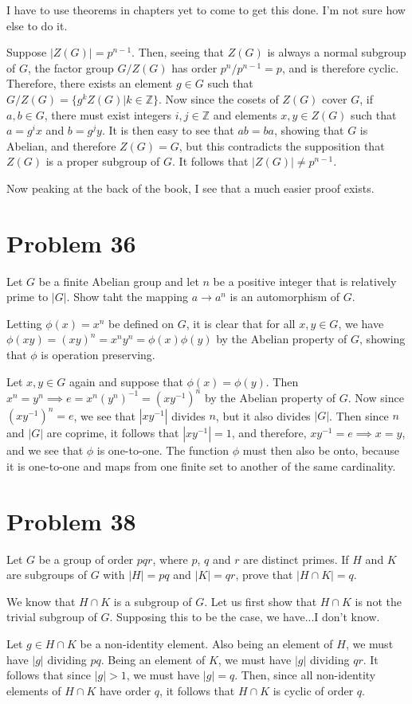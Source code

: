\documentclass[12pt]{article}
\newcommand{\Z}{\mathbb{Z}}
\begin{document}
I have to use theorems in chapters yet to come to get this done.  I'm not sure
how else to do it.

Suppose $|Z(G)|=p^{n-1}$.  Then, seeing that $Z(G)$ is always
a normal subgroup of $G$, the factor group $G/Z(G)$ has
order $p^n/p^{n-1}=p$, and is therefore cyclic.
Therefore, there exists an element $g\in G$ such that $G/Z(G)=\{g^kZ(G)|k\in\Z\}$.
Now since the cosets of $Z(G)$ cover $G$, if $a,b\in G$, there must exist integers $i,j\in\Z$
and elements $x,y\in Z(G)$ such that $a=g^ix$ and $b=g^jy$.
It is then easy to see that $ab=ba$, showing that $G$ is
Abelian, and therefore $Z(G)=G$, but this contradicts the supposition that $Z(G)$ is a proper
subgroup of $G$.  It follows that $|Z(G)|\neq p^{n-1}$.

Now peaking at the back of the book, I see that a much easier
proof exists.

\section*{Problem 36}

Let $G$ be a finite Abelian group and let $n$ be a positive integer that is relatively prime to $|G|$.
Show taht the mapping $a\to a^n$ is an automorphism of $G$.

Letting $\phi(x)=x^n$ be defined on $G$, it is clear that for all $x,y\in G$,
we have $\phi(xy)=(xy)^n=x^ny^n=\phi(x)\phi(y)$ by the Abelian property
of $G$, showing that $\phi$ is operation preserving.

Let $x,y\in G$ again and suppose that $\phi(x)=\phi(y)$.
Then $x^n=y^n\implies e=x^n(y^n)^{-1}=(xy^{-1})^n$
by the Abelian property of $G$.  Now since $(xy^{-1})^n=e$,
we see that $|xy^{-1}|$ divides $n$, but it also divides $|G|$.
Then since $n$ and $|G|$ are coprime, it follows that $|xy^{-1}|=1$,
and therefore, $xy^{-1}=e\implies x=y$, and we see that
$\phi$ is one-to-one.  The function $\phi$ must then also be onto,
because it is one-to-one and maps from one finite set to another
of the same cardinality.

\section*{Problem 38}

Let $G$ be a group of order $pqr$, where $p$, $q$ and $r$ are distinct primes.
If $H$ and $K$ are subgroups of $G$ with $|H|=pq$ and $|K|=qr$, prove
that $|H\cap K|=q$.

We know that $H\cap K$ is a subgroup of $G$.  Let us first show
that $H\cap K$ is not the trivial subgroup of $G$.  Supposing this
to be the case, we have...I don't know.

Let $g\in H\cap K$ be a non-identity element.
Also being an element of $H$, we must have $|g|$ dividing $pq$.
Being an element of $K$, we must have $|g|$ dividing $qr$.
It follows that since $|g|>1$, we must have $|g|=q$.
Then, since all non-identity elements of $H\cap K$ have order $q$,
it follows that $H\cap K$ is cyclic of order $q$.
\end{document}

